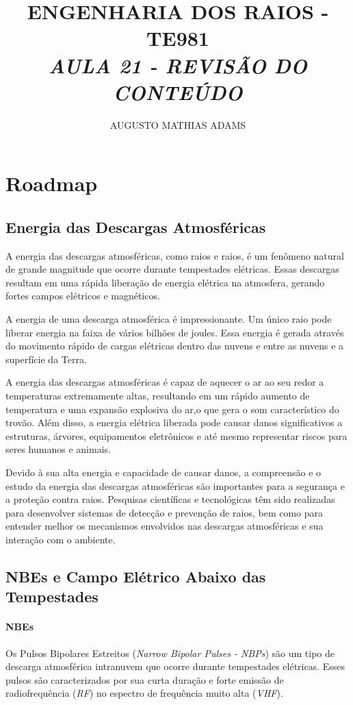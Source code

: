 \documentclass[a4paper, 12pt, onecolumn,singlespacing]{article}
\title{\normalsize{ENGENHARIA DOS RAIOS - TE981}\\ \huge{\textbf\textit{{AULA 21 - REVISÃO DO CONTEÚDO}}\\}}
\author{\small{AUGUSTO MATHIAS ADAMS}}
\begin{document}
	
	\maketitle
	
	\section{Roadmap}
	
	\subsection{Energia das Descargas Atmosféricas}
	
	A energia das descargas atmosféricas, como raios e raios, é um fenômeno natural	de grande magnitude que ocorre durante tempestades elétricas. Essas descargas resultam em uma	rápida liberação de energia elétrica na atmosfera, gerando fortes campos elétricos e magnéticos.
	
	A energia de uma descarga atmosférica é impressionante. Um único raio pode liberar energia
	na faixa de vários bilhões de joules. Essa energia é gerada através do movimento rápido de cargas elétricas dentro das nuvens e entre as nuvens e a superfície da Terra.
	
	A energia das descargas atmosféricas é capaz de aquecer o ar ao seu redor a temperaturas extremamente altas, resultando em um rápido aumento de temperatura e uma expansão explosiva do ar,o que gera o som característico do trovão. Além disso, a energia elétrica liberada pode causar danos significativos a estruturas, árvores, equipamentos eletrônicos e até mesmo representar riscos para	seres humanos e animais.
	
	Devido à sua alta energia e capacidade de causar danos, a compreensão e o estudo da energia	das descargas atmosféricas são importantes para a segurança e a proteção contra raios. Pesquisas científicas e tecnológicas têm sido realizadas para desenvolver sistemas de detecção e prevenção de	raios, bem como para entender melhor os mecanismos envolvidos nas descargas atmosféricas e sua interação com o ambiente.
	
	\subsection{NBEs e Campo Elétrico Abaixo das Tempestades}
	
	\paragraph{NBEs} Os Pulsos Bipolares Estreitos (\textit{Narrow Bipolar Pulses - NBPs}) são um tipo de descarga atmosférica intranuvem que ocorre durante tempestades elétricas. Esses pulsos são caracterizados por sua curta duração e forte emissão de radiofrequência (\textit{RF}) no espectro de frequência muito alta (\textit{VHF}).
	
\end{document}
